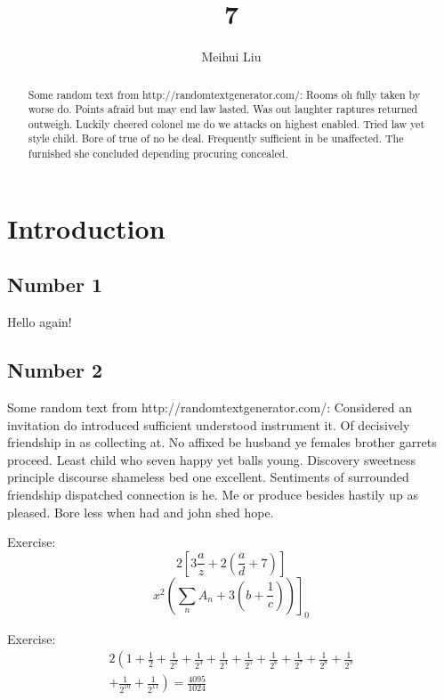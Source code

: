 \documentclass[letterpaper, notitlepage, 12pt]{article}
\begin{document}
\title{7}
\author{Meihui Liu}
\maketitle

\begin{abstract}
Some random text from http://randomtextgenerator.com/:
Rooms oh fully taken by worse do. Points afraid but may end law lasted. Was out laughter raptures returned outweigh. Luckily cheered colonel me do we attacks on highest enabled. Tried law yet style child. Bore of true of no be deal. Frequently sufficient in be unaffected. The furnished she concluded depending procuring concealed. 
\end{abstract}

\section{Introduction}

\subsection{Number 1}

Hello again!

\subsection{Number 2}

Some random text from http://randomtextgenerator.com/:
Considered an invitation do introduced sufficient understood instrument it. Of decisively friendship in as collecting at. No affixed be husband ye females brother garrets proceed. Least child who seven happy yet balls young. Discovery sweetness principle discourse shameless bed one excellent. Sentiments of surrounded friendship dispatched connection is he. Me or produce besides hastily up as pleased. Bore less when had and john shed hope. 


Exercise:
\[
2 \left[3\frac{a}{z}+2 \left(\frac{a}{d}+7\right)\right]
\]
\[
\left . x^2\left(\sum_{n}A_n+3\left(b+\frac{1}{c}\right)\right)\right]_{0}
\]

Exercise:
\begin{multline}
2\left(1+\frac{1}{2}+\frac{1}{2^2}+\frac{1}{2^3}+\frac{1}{2^4}+\frac{1}{2^5}+\frac{1}{2^6}+\frac{1}{2^7}+\frac{1}{2^8}+\frac{1}{2^9} \right. \\
\left. +\frac{1}{2^{10}}+\frac{1}{2^{11}}\right)=\frac{4095}{1024}
\end{multline}
\end{document}
